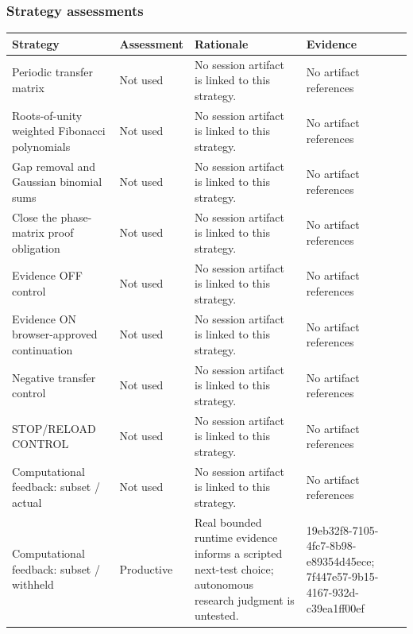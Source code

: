\documentclass[11pt]{article}
\begin{document}
\subsubsection*{Strategy assessments}
\begin{longtable}{>{\raggedright\arraybackslash}p{.16\linewidth}>{\raggedright\arraybackslash}p{.15\linewidth}>{\raggedright\arraybackslash}p{.40\linewidth}>{\raggedright\arraybackslash}p{.17\linewidth}}
\toprule Strategy & Assessment & Rationale & Evidence \\
\midrule\endhead
Periodic transfer matrix & Not used & No session artifact is linked to this strategy. & No artifact references \\
Roots-of-unity weighted Fibonacci polynomials & Not used & No session artifact is linked to this strategy. & No artifact references \\
Gap removal and Gaussian binomial sums & Not used & No session artifact is linked to this strategy. & No artifact references \\
Close the phase-matrix proof obligation & Not used & No session artifact is linked to this strategy. & No artifact references \\
Evidence OFF control & Not used & No session artifact is linked to this strategy. & No artifact references \\
Evidence ON browser-approved continuation & Not used & No session artifact is linked to this strategy. & No artifact references \\
Negative transfer control & Not used & No session artifact is linked to this strategy. & No artifact references \\
STOP/RELOAD CONTROL & Not used & No session artifact is linked to this strategy. & No artifact references \\
Computational feedback: subset / actual & Not used & No session artifact is linked to this strategy. & No artifact references \\
Computational feedback: subset / withheld & Productive & Real bounded runtime evidence informs a scripted next-test choice; autonomous research judgment is untested. & 19eb32f8-7105-4fc7-8b98-e89354d45ece; 7f447e57-9b15-4167-932d-c39ea1ff00ef \\
\bottomrule
\end{longtable}
\end{document}
